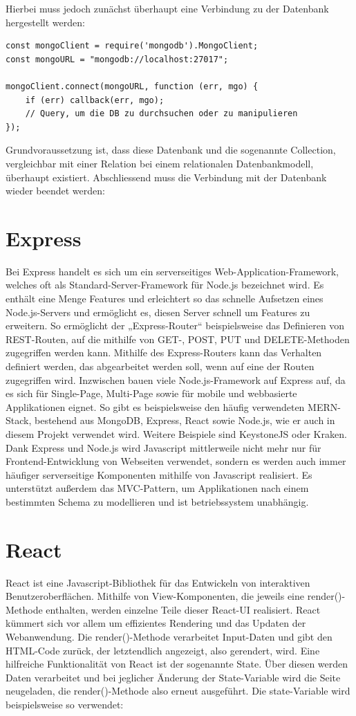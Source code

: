 \documentclass[12pt,a4paper]{report}
\begin{document}
Hierbei muss jedoch zunächst überhaupt eine Verbindung zu der Datenbank hergestellt werden: 

\begin{verbatim}
const mongoClient = require('mongodb').MongoClient;
const mongoURL = "mongodb://localhost:27017";

mongoClient.connect(mongoURL, function (err, mgo) {
    if (err) callback(err, mgo);
    // Query, um die DB zu durchsuchen oder zu manipulieren
});
\end{verbatim}

Grundvoraussetzung ist, dass diese Datenbank und die sogenannte Collection, vergleichbar mit einer Relation bei einem relationalen Datenbankmodell, überhaupt existiert.
Abschliessend muss die Verbindung mit der Datenbank wieder beendet werden:

\section{Express}
Bei Express handelt es sich um ein serverseitiges Web-Application-Framework, welches oft als Standard-Server-Framework für Node.js bezeichnet wird. Es enthält eine Menge Features und erleichtert so das schnelle Aufsetzen eines Node.js-Servers und ermöglicht es, diesen Server schnell um Features zu erweitern. 
So ermöglicht der „Express-Router“ beispielsweise das Definieren von REST-Routen, auf die mithilfe von GET-, POST, PUT und DELETE-Methoden zugegriffen werden kann. Mithilfe des Express-Routers kann das Verhalten definiert werden, das abgearbeitet werden soll, wenn auf eine der Routen zugegriffen wird. 
Inzwischen bauen viele Node.js-Framework auf Express auf, da es sich für Single-Page, Multi-Page sowie für mobile und webbasierte Applikationen eignet. So gibt es beispielsweise den häufig verwendeten MERN-Stack, bestehend aus MongoDB, Express, React sowie Node.js, wie er auch in diesem Projekt verwendet wird. Weitere Beispiele sind KeystoneJS oder Kraken.
Dank Express und Node.js wird Javascript mittlerweile nicht mehr nur für Frontend-Entwicklung von Webseiten verwendet, sondern es werden auch immer häufiger serverseitige Komponenten mithilfe von Javascript realisiert.
Es unterstützt außerdem das MVC-Pattern, um Applikationen nach einem bestimmten Schema zu modellieren und ist betriebssystem unabhängig. 

\section{React}
React ist eine Javascript-Bibliothek für das Entwickeln von interaktiven Benutzeroberflächen. Mithilfe von View-Komponenten, die jeweils eine render()-Methode enthalten, werden einzelne Teile dieser React-UI realisiert. React kümmert sich vor allem um effizientes Rendering und das Updaten der Webanwendung.
Die render()-Methode verarbeitet Input-Daten und gibt den HTML-Code zurück, der letztendlich angezeigt, also gerendert, wird.
Eine hilfreiche Funktionalität von React ist der sogenannte State. Über diesen werden Daten verarbeitet und bei jeglicher Änderung der State-Variable wird die Seite neugeladen, die render()-Methode also erneut ausgeführt.
Die state-Variable wird beispielsweise so verwendet:
\end{document}

